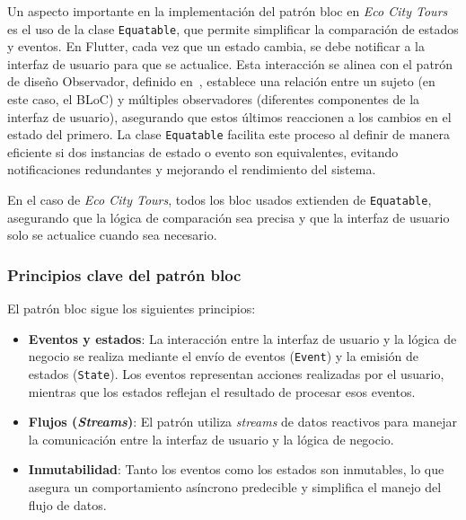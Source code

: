 Un aspecto importante en la implementación del patrón \acrshort{bloc} en \textit{Eco City Tours} es el uso de la clase \texttt{Equatable}, que permite simplificar la comparación de estados y eventos. En Flutter, cada vez que un estado cambia, se debe notificar a la interfaz de usuario para que se actualice. Esta interacción se alinea con el patrón de diseño Observador, definido en~\cite{gamma2002patrones}, establece una relación entre un sujeto (en este caso, el BLoC) y múltiples observadores (diferentes componentes de la interfaz de usuario), asegurando que estos últimos reaccionen a los cambios en el estado del primero. La clase \texttt{Equatable} facilita este proceso al definir de manera eficiente si dos instancias de estado o evento son equivalentes, evitando notificaciones redundantes y mejorando el rendimiento del sistema.

En el caso de \textit{Eco City Tours}, todos los \acrshort{bloc} usados extienden de \texttt{Equatable}, asegurando que la lógica de comparación sea precisa y que la interfaz de usuario solo se actualice cuando sea necesario. 

\subsubsection{Principios clave del patrón \acrshort{bloc}}
	El patrón \acrfull{bloc} sigue los siguientes principios:
	\begin{itemize}
		\item \textbf{Eventos y estados}: La interacción entre la interfaz de usuario y la lógica de negocio se realiza mediante el envío de eventos (\texttt{Event}) y la emisión de estados (\texttt{State}). Los eventos representan acciones realizadas por el usuario, mientras que los estados reflejan el resultado de procesar esos eventos.
		\item \textbf{Flujos (\textit{Streams})}: El patrón utiliza \textit{streams} de datos reactivos para manejar la comunicación entre la interfaz de usuario y la lógica de negocio.
		\item \textbf{Inmutabilidad}: Tanto los eventos como los estados son inmutables, lo que asegura un comportamiento asíncrono predecible y simplifica el manejo del flujo de datos.
	\end{itemize}
	

